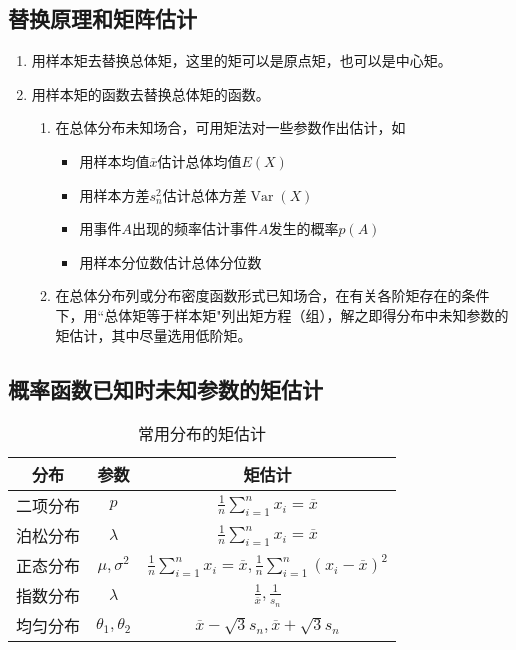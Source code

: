 \subsection{替换原理和矩阵估计}
\begin{enumerate}
    \item 用样本矩去替换总体矩，这里的矩可以是原点矩，也可以是中心矩。
    \item 用样本矩的函数去替换总体矩的函数。
          \begin{enumerate}
              \item 在总体分布未知场合，可用矩法对一些参数作出估计，如
                    \begin{itemize}
                        \item 用样本均值$\overline{x}$估计总体均值$E(X)$
                        \item 用样本方差$s_{n}^2$估计总体方差$\operatorname{Var}(X)$
                        \item 用事件$A$出现的频率估计事件$A$发生的概率$p(A)$
                        \item 用样本分位数估计总体分位数
                    \end{itemize}
              \item 在总体分布列或分布密度函数形式已知场合，在有关各阶矩存在的条件下，用“总体矩等于样本矩"列出矩方程（组），解之即得分布中未知参数的矩估计，其中尽量选用低阶矩。
          \end{enumerate}
\end{enumerate}
\subsection{概率函数已知时未知参数的矩估计}
\begin{table}[H]
    \centering
    \caption{常用分布的矩估计}
    \begin{tabular}{c|c|c}
        \toprule
        分布   & 参数                  & 矩估计                                                                                                   \\
        \midrule
        二项分布 & $p$                 & $\frac{1}{n}\sum\limits_{i=1}^n x_i=\overline{x} $                                                    \\
        泊松分布 & $\lambda$           & $\frac{1}{n}\sum\limits_{i=1}^n x_i = \overline{x}$                                                   \\
        正态分布 & $\mu,\sigma^2$      & $\frac{1}{n}\sum\limits_{i=1}^n x_i=\overline{x},\frac{1}{n}\sum\limits_{i=1}^n (x_i-\overline{x})^2$ \\
        指数分布 & $\lambda$           & $\frac{1}{\overline{x}},\frac{1}{s_n}$                                                                \\
        均匀分布 & $\theta_1,\theta_2$ & $\overline{x}-\sqrt{3}s_n,\overline{x}+\sqrt{3}s_n$                                                   \\

        \bottomrule
    \end{tabular}
\end{table}

